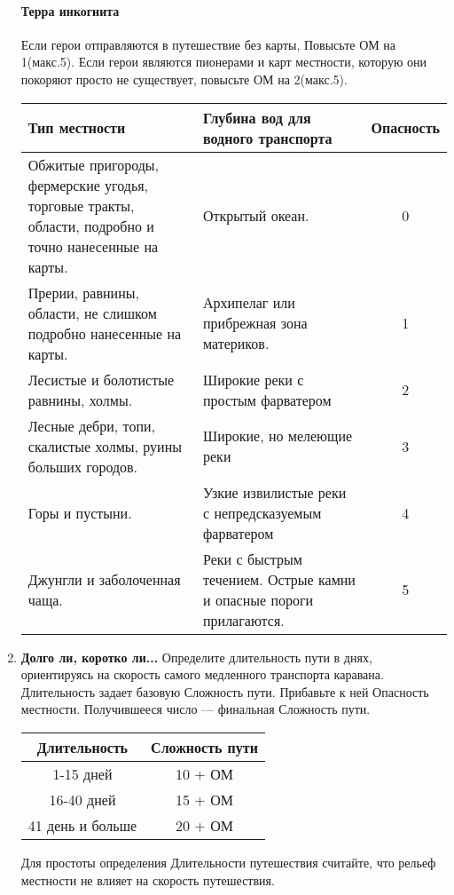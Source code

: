 \begin{enumerate}
\begin{tcolorbox}
\paragraph{Терра инкогнита} Если герои отправляются в путешествие без карты, Повысьте ОМ на 1(макс.5). Если герои являются пионерами и карт местности, которую они покоряют просто не существует, повысьте ОМ на 2(макс.5).
\end{tcolorbox}
\begin{center}
\begin{tabular}{|p{7cm}|p{7cm}|c|}
\hline
Тип местности & Глубина вод для водного транспорта & Опасность \\ \hline
Обжитые пригороды, фермерские угодья, торговые тракты, области, подробно и точно нанесенные на карты. & Открытый океан. & 0 \\ \hline
Прерии, равнины, области, не слишком подробно нанесенные на карты. & Архипелаг или прибрежная зона материков. & 1 \\ \hline
Лесистые и болотистые равнины, холмы. & Широкие реки с простым фарватером & 2 \\ \hline
Лесные дебри, топи, скалистые холмы, руины больших городов. & Широкие, но мелеющие реки & 3 \\ \hline
Горы и пустыни. & Узкие извилистые реки с непредсказуемым фарватером & 4 \\ \hline
Джунгли и заболоченная чаща. & Реки с быстрым течением. Острые камни и опасные пороги прилагаются. & 5 \\ \hline
\end{tabular}
\end{center}
\item \textbf{Долго ли, коротко ли...} Определите длительность пути в днях, ориентируясь на скорость самого медленного транспорта каравана. Длительность задает базовую Сложность пути. Прибавьте к ней Опасность местности. Получившееся число — финальная Сложность пути.
\begin{center}
\begin{tabular}{|c|c|}
\hline
Длительность & Сложность пути \\ \hline
1-15 дней & 10 + ОМ \\ \hline
16-40 дней & 15 + ОМ \\ \hline
41 день и больше & 20 + ОМ \\ \hline
\end{tabular}
\end{center}
\begin{tcolorbox}
Для простоты определения Длительности путешествия считайте, что рельеф местности не влияет на скорость путешествия.

\end{tcolorbox}
\end{enumerate}

